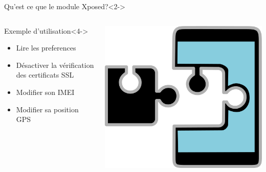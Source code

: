 \documentclass[aspectratio=1610, ]{beamer}%
\begin{document}
  \begin{frame}[t]
    \slidetitle[Xposed]
    \begin{block}{Qu'est ce que le module Xposed?}<2->
    \end{block}
    \begin{columns} 
      \begin{column}{0.7\linewidth}
        \begin{block}{Exemple d'utilisation}<4->
          \begin{itemize}
          \item<5-> Lire les preferences 
          \item<6-> Désactiver la vérification des certificats SSL
          \item<7-> Modifier son IMEI
          \item<8-> Modifier sa position GPS
          \end{itemize}
        \end{block}
      \end{column}
      \begin{column}{0.25\linewidth}
        \centering
        \includegraphics[width=0.9\linewidth]{img/xposed.png}
      \end{column}
    \end{columns}
  \end{frame}
\end{document}
